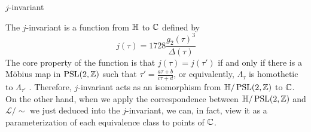 \begin{hyperbolicbox}{$j$-invariant}
    \small
    \begin{defi}
        The $j$-invariant is a function from $\mathbb{H}$ to $\mathbb{C}$ defined by
        $$
        j(\tau)=1728\frac{g_2(\tau)^3}{\Delta(\tau)}
        $$
        The core property of the function is that $j(\tau)=j(\tau')$ if and only if there is a M\"obius map in $\operatorname{PSL}(2,\mathbb{Z})$ such that $\tau'=\frac{a\tau+b}{c\tau+d}$, or equivalently, $\Lambda_\tau$ is homothetic to $\Lambda_{\tau'}$ \cite{silvermanAT}. Therefore, $j$-invariant acts as an isomorphism from $\mathbb{H}/\operatorname{PSL}(2,\mathbb{Z})$ to $\mathbb{C}$. On the other hand, when we apply the correspondence between $\mathbb{H}/\operatorname{PSL}(2,\mathbb{Z})$ and $\mathcal{L}/\sim$ we just deduced into the $j$-invariant, we can, in fact, view it as a parameterization of each equivalence class to points of $\mathbb{C}$.   
    \end{defi}
\end{hyperbolicbox}
